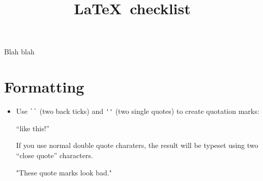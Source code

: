 \documentclass{article}
\title{\protect\LaTeX\ checklist}
\date{}
\begin{document}
\maketitle

Blah blah
\def\arraystretch{1.5}

\section*{Formatting}
\label{sec:formatting}

\begin{itemize}
\item Use \verb|``| (two back ticks) and \verb|''| (two single quotes)
  to create quotation marks:
\begin{good}
``like this!''
\end{good}
If you use normal double quote charaters, the result will be typeset
using two ``close quote'' characters.
\begin{bad}
"These quote marks look bad."
\end{bad}



\end{itemize}
\end{document}
